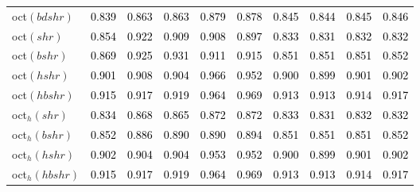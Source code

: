 \begin{tabular}[t]{l|ccccccccc}
oct$(bdshr)$ & \textcolor{black}{0.839} & \textcolor{black}{0.863} & \textcolor{black}{0.863} & \textcolor{black}{0.879} & \textcolor{black}{0.878} & \textcolor{black}{0.845} & \textcolor{black}{0.844} & \textcolor{black}{0.845} & \textcolor{black}{0.846}\\
oct$(shr)$ & \textcolor{black}{0.854} & \textcolor{black}{0.922} & \textcolor{black}{0.909} & \textcolor{black}{0.908} & \textcolor{black}{0.897} & \textcolor{black}{0.833} & \textcolor{black}{0.831} & \textcolor{black}{0.832} & \textcolor{black}{0.832}\\
oct$(bshr)$ & \textcolor{black}{0.869} & \textcolor{black}{0.925} & \textcolor{black}{0.931} & \textcolor{black}{0.911} & \textcolor{black}{0.915} & \textcolor{black}{0.851} & \textcolor{black}{0.851} & \textcolor{black}{0.851} & \textcolor{black}{0.852}\\
oct$(hshr)$ & \textcolor{black}{0.901} & \textcolor{black}{0.908} & \textcolor{black}{0.904} & \textcolor{black}{0.966} & \textcolor{black}{0.952} & \textcolor{black}{0.900} & \textcolor{black}{0.899} & \textcolor{black}{0.901} & \textcolor{black}{0.902}\\
oct$(hbshr)$ & \textcolor{black}{0.915} & \textcolor{black}{0.917} & \textcolor{black}{0.919} & \textcolor{black}{0.964} & \textcolor{black}{0.969} & \textcolor{black}{0.913} & \textcolor{black}{0.913} & \textcolor{black}{0.914} & \textcolor{black}{0.917}\\
oct$_h(shr)$ & \textcolor{black}{0.834} & \textcolor{black}{0.868} & \textcolor{black}{0.865} & \textcolor{black}{0.872} & \textcolor{black}{0.872} & \textcolor{black}{0.833} & \textcolor{black}{0.831} & \textcolor{black}{0.832} & \textcolor{black}{0.832}\\
oct$_h(bshr)$ & \textcolor{black}{0.852} & \textcolor{black}{0.886} & \textcolor{black}{0.890} & \textcolor{black}{0.890} & \textcolor{black}{0.894} & \textcolor{black}{0.851} & \textcolor{black}{0.851} & \textcolor{black}{0.851} & \textcolor{black}{0.852}\\
oct$_h(hshr)$ & \textcolor{black}{0.902} & \textcolor{black}{0.904} & \textcolor{black}{0.904} & \textcolor{black}{0.953} & \textcolor{black}{0.952} & \textcolor{black}{0.900} & \textcolor{black}{0.899} & \textcolor{black}{0.901} & \textcolor{black}{0.902}\\
oct$_h(hbshr)$ & \textcolor{black}{0.915} & \textcolor{black}{0.917} & \textcolor{black}{0.919} & \textcolor{black}{0.964} & \textcolor{black}{0.969} & \textcolor{black}{0.913} & \textcolor{black}{0.913} & \textcolor{black}{0.914} & \textcolor{black}{0.917}\\
\bottomrule
\end{tabular}
